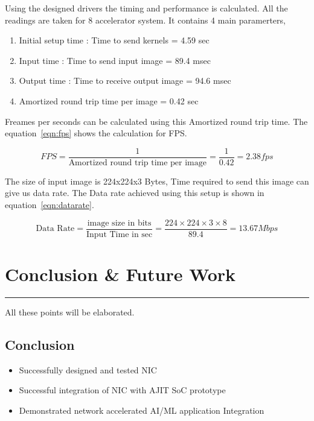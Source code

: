\documentclass[12pt]{report}
\begin{document}
	Using the designed drivers the timing and performance is calculated. All the readings are taken for 8 accelerator system. 
	It contains 4 main paramerters, 

	\begin{enumerate}
		\item Initial setup time : Time to send kernels = 4.59 sec
		\item Input time : Time to send input image = 89.4 msec
		\item Output time : Time to receive output image = 94.6 msec
		\item Amortized round trip time per image = 0.42 sec
	\end{enumerate}

	Freames per seconds can be calculated using this Amortized round trip time. The equation~\ref{eqn:fps} shows the calculation for FPS.

	\begin{center}

		\begin{equation}\label{eqn:fps}
				FPS = \frac {1} {\text{Amortized round trip time per image}} = \frac{1}{0.42} = 2.38 fps	
		\end{equation}
	\end{center}

	The size of input image is 224x224x3 Bytes, Time required to send this image can give us data rate. 
	The Data rate achieved using this setup is shown in equation~\ref{eqn:datarate}.

	\begin{center}

		\begin{equation}\label{eqn:datarate}
			\text{Data Rate} = \frac {\text{image size in bits}} {\text{Input Time in sec}} = \frac{224\times224\times3\times8}{89.4} = 13.67 	Mbps
		\end{equation}
	\end{center}


\newpage
\chapter{Conclusion \& Future Work} \label{5}
\rule[10pt]{\linewidth}{3pt}

All these points will be elaborated.

\section{Conclusion}
\begin{itemize}
		\item  Successfully designed and tested NIC
		\item  Successful integration of NIC with AJIT SoC prototype
		\item  Demonstrated network accelerated AI/ML application Integration
	\end{itemize}	
\end{document}
